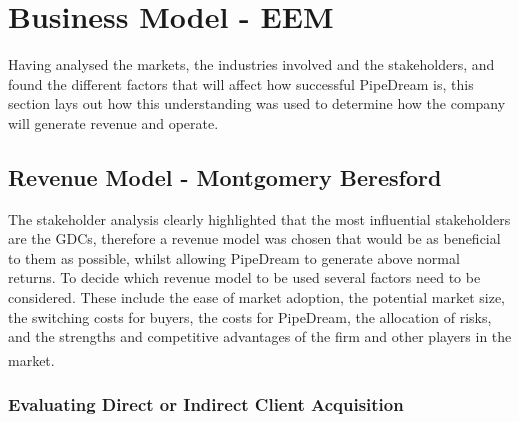 \documentclass[11pt]{article}		%
\newcommand{\supercite}[1]{\textsuperscript{\cite{#1}}}		%
\begin{document}
	\section{Business Model - EEM}\label{businessmodel}
	  
	 Having analysed the markets, the industries involved and the stakeholders, and found the different factors that will affect how successful PipeDream is, this section lays out how this understanding was used to determine how the company will generate revenue and operate.      
    
		\subsection[Revenue Model]{Revenue Model - Montgomery Beresford}
		
     The stakeholder analysis clearly highlighted that the most influential stakeholders are the GDCs, therefore a revenue model was chosen that would be as beneficial to them as possible, whilst allowing PipeDream to generate above normal returns. To decide which revenue model to be used several factors need to be considered. These include the ease of market adoption, the potential market size,  the switching costs for buyers, the costs for PipeDream, the allocation of risks, and the strengths and competitive advantages of the firm and other players in the market.\supercite{Daniel}
     
    \subsubsection{Evaluating Direct or Indirect Client Acquisition}
    
\end{document}
